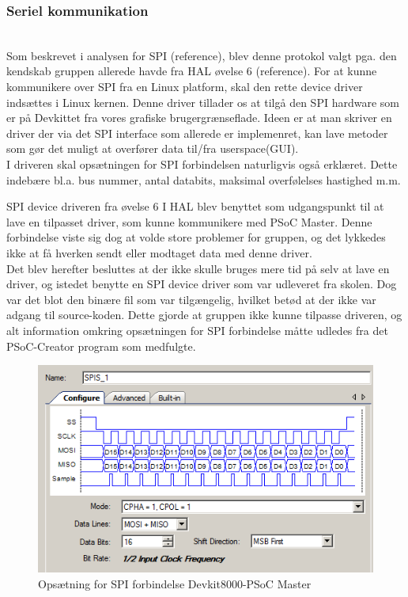 \subsubsection{Seriel kommunikation}

\\
Som beskrevet i analysen for SPI (reference), blev denne protokol valgt pga. den kendskab gruppen allerede havde fra HAL øvelse 6 (reference). 
For at kunne kommunikere over SPI fra en Linux platform, skal den rette device driver indsættes i Linux kernen. Denne driver tillader os at tilgå
den SPI hardware som er på Devkittet fra vores grafiske brugergrænseflade. Ideen er at man skriver en driver der via det SPI interface som allerede er 
implemenret, kan lave metoder som gør det muligt at overfører data til/fra userspace(GUI).\\

I driveren skal opsætningen for SPI forbindelsen naturligvis også erklæret. Dette indebære bl.a. bus nummer, antal databits, maksimal overfølelses hastighed m.m.  
 
SPI device driveren fra øvelse 6 I HAL blev benyttet som udgangspunkt til at lave en tilpasset driver, som kunne kommunikere med PSoC Master. 
Denne forbindelse viste sig dog at volde store problemer for gruppen, og det lykkedes ikke at få hverken sendt eller modtaget data med denne driver.\\

Det blev herefter besluttes at der ikke skulle bruges mere tid på selv at lave en driver, og istedet benytte en SPI device driver som var udleveret fra skolen.
Dog var det blot den binære fil som var tilgængelig, hvilket betød at der ikke var adgang til source-koden. Dette gjorde at gruppen ikke kunne tilpasse driveren,
og alt information omkring opsætningen for SPI forbindelse måtte udledes fra det PSoC-Creator program som medfulgte. 

\begin{figure}[H]
	\includegraphics[scale=0.6]{tex/Design/SPI/Clock_mode_SPI}
	\caption{Opsætning for SPI forbindelse Devkit8000-PSoC Master}
	\label{SPI_opsaetning}
\end{figure}


